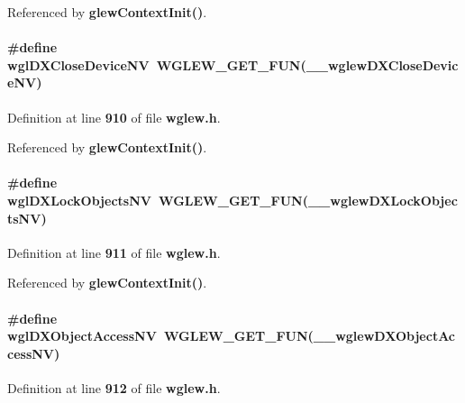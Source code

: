 Referenced by {\bf glew\+Context\+Init()}.

\paragraph[{wgl\+D\+X\+Close\+Device\+NV}]{\setlength{\rightskip}{0pt plus 5cm}\#define wgl\+D\+X\+Close\+Device\+NV~{\bf W\+G\+L\+E\+W\+\_\+\+G\+E\+T\+\_\+\+F\+UN}({\bf \+\_\+\+\_\+wglew\+D\+X\+Close\+Device\+NV})}\label{wglew_8h_a0f5ab5a634578f6dc65987d9b4384ff3}


Definition at line {\bf 910} of file {\bf wglew.\+h}.



Referenced by {\bf glew\+Context\+Init()}.

\paragraph[{wgl\+D\+X\+Lock\+Objects\+NV}]{\setlength{\rightskip}{0pt plus 5cm}\#define wgl\+D\+X\+Lock\+Objects\+NV~{\bf W\+G\+L\+E\+W\+\_\+\+G\+E\+T\+\_\+\+F\+UN}({\bf \+\_\+\+\_\+wglew\+D\+X\+Lock\+Objects\+NV})}\label{wglew_8h_a336fd7860000eddba56e05abf316ae34}


Definition at line {\bf 911} of file {\bf wglew.\+h}.



Referenced by {\bf glew\+Context\+Init()}.

\paragraph[{wgl\+D\+X\+Object\+Access\+NV}]{\setlength{\rightskip}{0pt plus 5cm}\#define wgl\+D\+X\+Object\+Access\+NV~{\bf W\+G\+L\+E\+W\+\_\+\+G\+E\+T\+\_\+\+F\+UN}({\bf \+\_\+\+\_\+wglew\+D\+X\+Object\+Access\+NV})}\label{wglew_8h_aeef3b7fc8a361e3ad411cbe12f3610dd}


Definition at line {\bf 912} of file {\bf wglew.\+h}.



